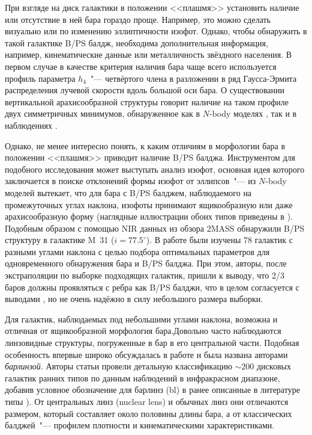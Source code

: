 \documentclass{trlnotes}
\begin{document}
При взгляде на диск галактики в положении <<плашмя>> установить наличие или отсутствие в ней бара гораздо проще. Например, это можно сделать визуально или по изменению эллиптичности изофот. Однако, чтобы обнаружить в такой галактике B/PS балдж, необходима дополнительная информация, например, кинематические данные или металличность звёздного населения. В первом случае в качестве критерия наличия бара чаще всего используется профиль параметра $h_4$~"---  четвёртого члена в разложении в ряд Гаусса-Эрмита \citep{vandermarel1993} распределения лучевой скорости вдоль большой оси бара.  О существовании вертикальной арахисообразной структуры говорит наличие на таком профиле двух симметричных минимумов, обнаруженное как в $N$-body моделях \citep{debattista2005,iannuzzi2015}, так и в наблюдениях \citep{mendez-abreu2008}.

Однако, не менее интересно понять, к каким отличиям в морфологии бара в положении  <<плашмя>> приводит наличие B/PS балджа.  Инструментом для подобного исследования может выступать анализ изофот, основная идея которого заключается в поиске отклонений формы изофот от эллипсов~"--- из $N$-body моделей вытекает, что для бара с B/PS балджем, наблюдаемого на промежуточных углах наклона, изофоты принимают ящикообразную или даже арахисообразную форму (наглядные иллюстрации обоих типов приведены в \cite[Fig.~2]{erwin2016}). Подобным образом с помощью NIR данных из обзора 2MASS  \citet{beaton2007} обнаружили B/PS структуру в галактике M~31 ($i = 77.5^\circ$). В работе \citet{erwin2013} были изучены 78 галактик с разными углами наклона с целью подбора оптимальных параметров для одновременного обнаружения бара и B/PS балджа. При этом, авторы, после экстраполяции по выборке подходящих галактик, пришли к выводу, что 2/3 баров должны проявляться с ребра как B/PS балджи, что в целом согласуется с выводами \citet{lutticke2000a}, но не очень надёжно в силу небольшого размера выборки.

Для галактик, наблюдаемых под небольшими углами наклона, возможна и отличная от ящикообразной морфология бара.Довольно часто наблюдаются линзовидные структуры, погруженные в бар в его центральной части. Подобная особенность впервые широко обсуждалась в работе \citet{laurikainen2011} и была названа авторами \emph{барлинзой}.  Авторы статьи провели детальную классификацию $\sim\!200$ дисковых галактик ранних типов по данным наблюдений в инфракрасном диапазоне, добавив условное обозначение для барлинз (bl) в ранее описанные в литературе типы \citep{devaucouleurs1959,buta2010}). От центральных линз (nuclear lens) и обычных линз они отличаются размером, который составляет около половины длины бара, а от классических балджей~"--- профилем плотности и кинематическими характеристиками. 
\end{document}
